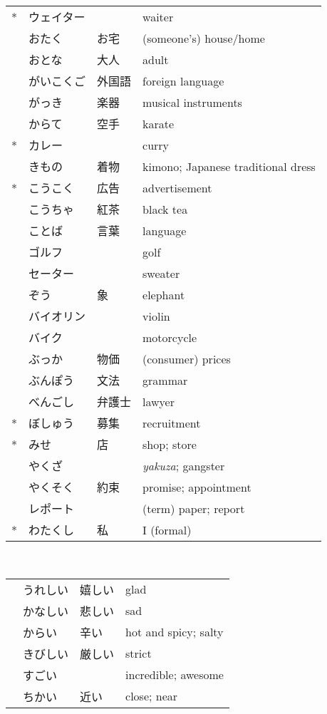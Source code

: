 \documentclass[notoc,notitlepage]{tufte-book}
\begin{document}
\begin{tabular}{r l l l}
  *  & ウェイター &        & waiter \\
     & おたく     & お宅   & (someone's) house/home \\
     & おとな     & 大人   & adult \\
     & がいこくご & 外国語 & foreign language \\
     & がっき     & 楽器   & musical instruments \\
     & からて     & 空手   & karate \\
  *  & カレー     &        & curry \\
     & きもの     & 着物   & kimono; Japanese traditional dress \\
  *  & こうこく   & 広告   & advertisement \\
     & こうちゃ   & 紅茶   & black tea \\
     & ことば     & 言葉   & language \\
     & ゴルフ     &        & golf \\
     & セーター   &        & sweater \\
     & ぞう       & 象     & elephant \\
     & バイオリン &        & violin \\
     & バイク     &        & motorcycle \\
     & ぶっか     & 物価   & (consumer) prices \\
     & ぶんぽう   & 文法   & grammar \\
     & べんごし   & 弁護士 & lawyer \\
  *  & ぼしゅう   & 募集   & recruitment \\
  *  & みせ       & 店     & shop; store \\
     & やくざ     &        & \textit{yakuza}; gangster \\
     & やくそく   & 約束   & promise; appointment \\
     & レポート   &        & (term) paper; report \\
  *  & わたくし   & 私     & I (formal)
\end{tabular}

 \\
\begin{tabular}{r l l l}
   & うれしい & 嬉しい & glad \\
   & かなしい & 悲しい & sad \\
   & からい   & 辛い   & hot and spicy; salty \\
   & きびしい & 厳しい & strict \\
   & すごい   &        & incredible; awesome \\
   & ちかい   & 近い   & close; near
\end{tabular}
\end{document}
